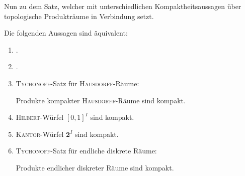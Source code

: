 Nun zu dem Satz, welcher \PIT mit unterschiedlichen Kompaktheitsaussagen über topologische Produkträume in Verbindung setzt.

\newpage
\begin{thm}
  \label{thm:pitequivalence}
  Die folgenden Aussagen sind äquivalent:
  \begin{enumerate}[(1)]
    \item \PIT.
    \item \UFT.
    \item \textsc{Tychonoff}-Satz für \textsc{Hausdorff}-Räume: 
      \begin{addmargin}[2em]{2em}%
        Produkte kompakter \textsc{Hausdorff}-Räume sind kompakt.
      \end{addmargin}
    \item \textsc{Hilbert}-Würfel $[0,1]^I$ sind kompakt.
    \item \textsc{Kantor}-Würfel $\mathbf{2}^I$ sind kompakt.
    \item \textsc{Tychonoff}-Satz für endliche diskrete Räume: 
      \begin{addmargin}[2em]{2em}%
        Produkte endlicher diskreter Räume sind kompakt.
      \end{addmargin}
  \end{enumerate}
\end{thm}

